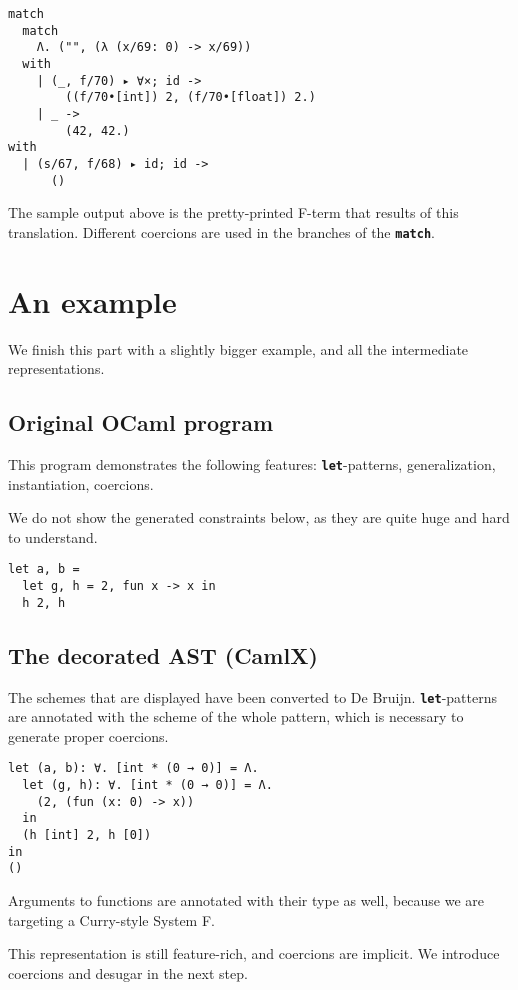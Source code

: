 \documentclass[10pt,a4paper,twoside,titlepage,twocolumn]{article}
\newcommand{\code}[1]{\textbf{\texttt{#1}}}
\begin{document}
\begin{verbatim}
match
  match
    Λ. ("", (λ (x/69: 0) -> x/69))
  with
    | (_, f/70) ▸ ∀×; id ->
        ((f/70•[int]) 2, (f/70•[float]) 2.)
    | _ ->
        (42, 42.)
with
  | (s/67, f/68) ▸ id; id ->
      ()
\end{verbatim}

The sample output above is the pretty-printed F-term that results of this
translation. Different coercions are used in the branches of the \code{match}.

\section{An example}

We finish this part with a slightly bigger example, and all the intermediate
representations.

\subsection{Original OCaml program}

This program demonstrates the following features: \code{let}-patterns,
generalization, instantiation, coercions.

We do not show the generated constraints below, as they are quite huge and hard
to understand.

\begin{verbatim}
let a, b =
  let g, h = 2, fun x -> x in
  h 2, h
\end{verbatim}

\subsection{The decorated AST (CamlX)}

The schemes that are displayed have been converted to De Bruijn.
\code{let}-patterns are annotated with the scheme of the whole pattern, which is
necessary to generate proper coercions.

\begin{verbatim}
let (a, b): ∀. [int * (0 → 0)] = Λ.
  let (g, h): ∀. [int * (0 → 0)] = Λ.
    (2, (fun (x: 0) -> x))
  in
  (h [int] 2, h [0])
in
()
\end{verbatim}

Arguments to functions are annotated with their type as well, because we are
targeting a Curry-style System F.

This representation is still feature-rich, and coercions are implicit. We
introduce coercions and desugar in the next step.
\end{document}
